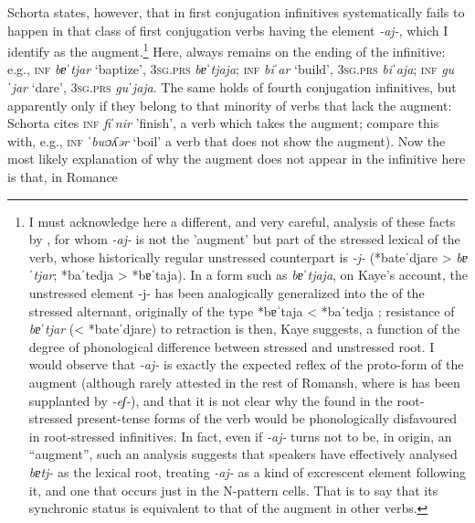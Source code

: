 \documentclass[output=paper,
modfonts
]{LSP/langsci}
\begin{document}
\largerpage[-1]
Schorta states, however, that   in first conjugation
infinitives systematically fails to happen in that class of first
conjugation verbs having the element \textit{-aj-}, which I identify as the
augment.\footnote{I must acknowledge here a different, and very careful,
  analysis of these facts by \citet*[291--310]{kaye2015}, for whom \textit{-aj-}
  is not the 'augment' but part of the stressed lexical  of the
  verb, whose historically regular unstressed counterpart is \textit{-j-}
  (*bateˈdjare \textgreater{} \textit{bɐˈtjar}; *baˈtedja \textgreater{}
  *bɐˈtaja). In a form such as \textit{bɐˈtjaja}, on Kaye's account, the
  unstressed element -j- has been analogically generalized into the 
  of the stressed alternant, originally of the type *bɐˈtaja \textless{}
  *baˈtedja \citep[307]{kaye2015}; resistance of \textit{bɐˈtjar} (\textless{}
  *bateˈdjare) to  retraction is then, Kaye suggests\citeyear[309]{kaye2015}, a
  function of the degree of phonological difference between stressed and
  unstressed root. I would observe that \textit{-aj-} is exactly the expected
  reflex of the proto-form of the augment (although rarely attested in
  the rest of Romansh, where is has been supplanted by \textit{-eʃ-}), and that
  it is not clear why the  found in the root-stressed present-tense
  forms of the verb would be phonologically disfavoured in root-stressed
  infinitives. In fact, even if \textit{-aj-} turns not to be, in origin, an
  ``augment'', such an analysis suggests that speakers have effectively
  analysed \textit{bɐtj-} as the lexical root, treating \textit{-aj-} as a kind of
  excrescent element following it, and one that occurs just in the
  N-pattern cells. That is to say that its synchronic status is
  equivalent to that of the augment in other verbs.} Here,  always
remains on the ending of the infinitive: e.g., \textsc{inf} \textit{bɐˈtjar}
`baptize', \textsc{3sg.prs} \textit{bɐˈtjaja}; \textsc{inf} \textit{biˈar} `build',
\textsc{3sg.prs} \textit{biˈaja}; \textsc{inf} \textit{guˈjar} `dare', \textsc{3sg.prs}
\textit{guˈjaja}. The same holds of fourth conjugation infinitives, but
apparently only if they belong to that minority of verbs that lack the
augment: Schorta cites \textsc{inf} \textit{fiˈnir} 'finish', a verb which takes
the augment; compare this with, e.g., \textsc{inf} \textit{ˈbwɔʎər} `boil' a verb
that does not show the augment). Now the most likely explanation of why
the augment does not appear in the infinitive here is that, in Romance
\end{document}
